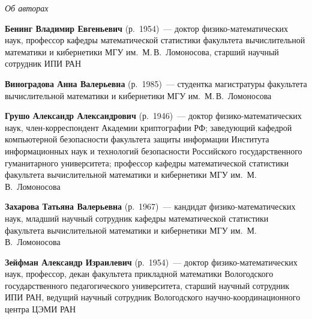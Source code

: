 \vspace*{-48pt}
\begin{center}\LARGE
\textit{Об авторах}
\end{center}
\thispagestyle{empty}

\vspace*{36pt}

\begin{multicols}{2}

\noindent
\textbf{Бенинг Владимир Евгеньевич} (р.\ 1954)~---  доктор физико-математических наук, 
профессор ка\-фед\-ры математической статистики факультета вы\-чис\-ли\-тель\-ной 
математики  и кибернетики МГУ им.\ М.\,В.~Ломоносова, старший научный сотрудник 
ИПИ РАН

\vspace*{11pt}

\noindent
\textbf{Виноградова Анна Валерьевна} (р.\ 1985)~---  студентка магистратуры факультета 
вычислительной математики и кибернетики МГУ им.\ М.\,В.~Ломоносова

\vspace*{11pt}

\noindent
\textbf{Грушо Александр Александрович} (р.\ 1946)~---  доктор физико-математических 
наук, член-корреспондент Академии криптографии РФ; заведующий ка\-фед\-рой компьютерной 
безопасности факультета защиты информации Института информационных наук и 
технологий безопасности Российского государственного гуманитарного университета; 
профессор кафедры математической статистики факультета вычислительной математики 
и кибернетики МГУ им.\ М.\,В.~Ломоносова

\vspace*{11pt}

\noindent
\textbf{Захарова Татьяна Валерьевна} (р.\ 1967)~---  кан\-дидат физико-математических 
наук, младший научный сотрудник кафедры математической статистики факультета 
вычислительной математики и кибернетики МГУ им.\ М.\,В.~Ломоносова


\vspace*{11pt}

\noindent
\textbf{Зейфман Александр Израилевич} (р.\ 1954)~---  доктор физико-математических 
наук, профессор, \mbox{декан} факультета прикладной математики Вологодского 
государственного педагогического университета, старший научный сотрудник ИПИ РАН, 
ведущий научный сотрудник Вологодского научно-ко\-ор\-ди\-на\-ци\-он\-но\-го центра ЦЭМИ 
РАН

\vspace*{11pt}


\end{multicols}
